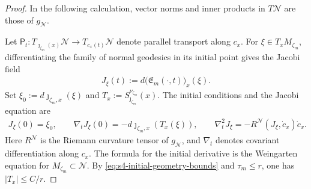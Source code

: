 \documentclass[a4paper,11pt,oneside,reqno]{amsart}
\numberwithin{equation}{section}
\theoremstyle{definition}
\begin{document}
\begin{proof}
    In the following calculation, vector norms and inner
    products in $T\mathcal N$ are those of $g_{\mathcal N}$.

    Let $\mathsf P_t:T_{\jmath_{\zeta_m}(x)}\mathcal N
    \to T_{c_x(t)}\mathcal N$ denote parallel transport along
    $c_x$. For $\xi\in T_xM_{\zeta_m}$, differentiating the
    family of normal geodesics in its initial point gives the
    Jacobi field
    \begin{align*}
        J_\xi(t):=d\bigl(\mathfrak E_m(\cdot,t)\bigr)_x(\xi).
    \end{align*}
    Set $\xi_0:=d\jmath_{\zeta_m,x}(\xi)$ and
    $T_x:=S_{\jmath_{\zeta_m}}^{\nu_{\zeta_m}}(x)$.
    The initial conditions and the Jacobi equation are
    \begin{align*}
        J_\xi(0)=\xi_0,\qquad
        \nabla_tJ_\xi(0)=-d\jmath_{\zeta_m,x}(T_x(\xi)),\qquad
        \nabla_t^2J_\xi=-R^{\mathcal N}(J_\xi,\dot c_x)\dot c_x.
    \end{align*}
    Here $R^{\mathcal N}$ is the Riemann curvature tensor
    of $g_{\mathcal N}$, and $\nabla_t$ denotes covariant
    differentiation along $c_x$. The formula for the initial
    derivative is the Weingarten equation for
    $M_{\zeta_m}\subset\mathcal N$.
    By \eqref{eq:s4-initial-geometry-bounds} and
    $\tau_m\leq r$, one has $|T_x|\leq C/r$.


\end{proof}
\end{document}

